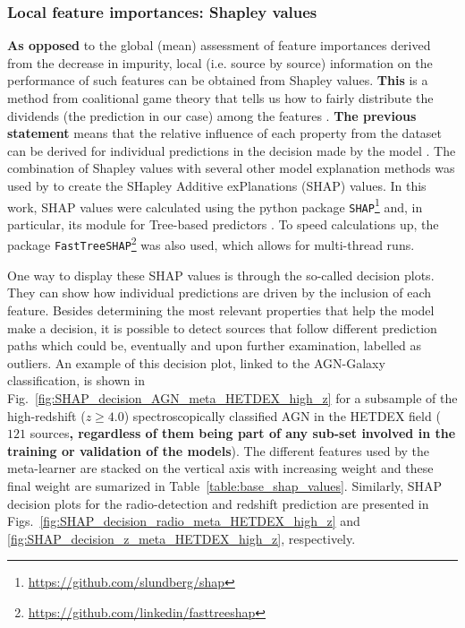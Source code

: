 \documentclass{aa}
\begin{document}
\subsubsection{\textbf{Local feature importances: }Shapley values}\label{sec:shapley_values}

\textbf{As opposed} to the global (mean) assessment of feature importances derived from the decrease in impurity, local (i.e. source by source) information on the performance of such features can be obtained from Shapley values. \textbf{This} is a method from coalitional game theory that tells us how to fairly distribute the dividends (the prediction in our case) among the features \citep{Shapley_article}. \textbf{The previous statement} means that the relative influence of each property from the dataset can be derived for individual predictions in the decision made by the model \citep[which is not the same as obtaining causal correlations between features and the target;][]{2020arXiv200805052M}. 
The combination of Shapley values with several other model explanation methods  was used by \citet[][]{NIPS2017_7062} to create the SHapley Additive exPlanations (SHAP) values. In this work, SHAP values were calculated using the python package \verb|SHAP|\footnote{\url{https://github.com/slundberg/shap}} and, in particular, its module for Tree-based predictors \citep{lundberg2020local2global}.
To speed calculations up, the package \verb|FastTreeSHAP|\footnote{\url{https://github.com/linkedin/fasttreeshap}} \citep[\texttt{v0.1.2};][]{2021arXiv210909847Y} was also used, which allows for multi-thread runs. 

One way to display these SHAP values is through the so-called decision plots. They can show how individual predictions are driven by the inclusion of each feature. Besides determining the most relevant properties that help the model make a decision, it is possible to detect sources that follow different prediction paths which could be, eventually and upon further examination, labelled as outliers. An example of this decision plot, linked to the AGN-Galaxy classification, is shown in Fig.~\ref{fig:SHAP_decision_AGN_meta_HETDEX_high_z} for a subsample of the high-redshift (${z \geq 4.0}$) spectroscopically classified AGN in the HETDEX field ($121$ sources\textbf{, regardless of them being part of any sub-set involved in the training or validation of the models}). The different features used by the meta-learner are stacked on the vertical axis with increasing weight and these final weight are sumarized in Table~\ref{table:base_shap_values}. Similarly, SHAP decision plots for the radio-detection and redshift prediction are presented in Figs.~\ref{fig:SHAP_decision_radio_meta_HETDEX_high_z} and \ref{fig:SHAP_decision_z_meta_HETDEX_high_z}, respectively.
\end{document}
